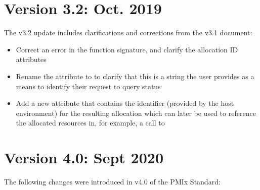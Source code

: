 \section{Version 3.2: Oct. 2019}

The v3.2 update includes clarifications and corrections from the v3.1 document:

\begin{itemize}
    \item Correct an error in the  function signature, and clarify the allocation ID attributes
    \item Rename the  attribute to  to clarify that this is a string the user provides as a means to identify their request to query status
    \item Add a new  attribute that contains the identifier (provided by the host environment) for the resulting allocation which can later be used to reference the allocated resources in, for example, a call to 
\end{itemize}


\section{Version 4.0: Sept 2020}


The following changes were introduced in v4.0 of the PMIx Standard:

